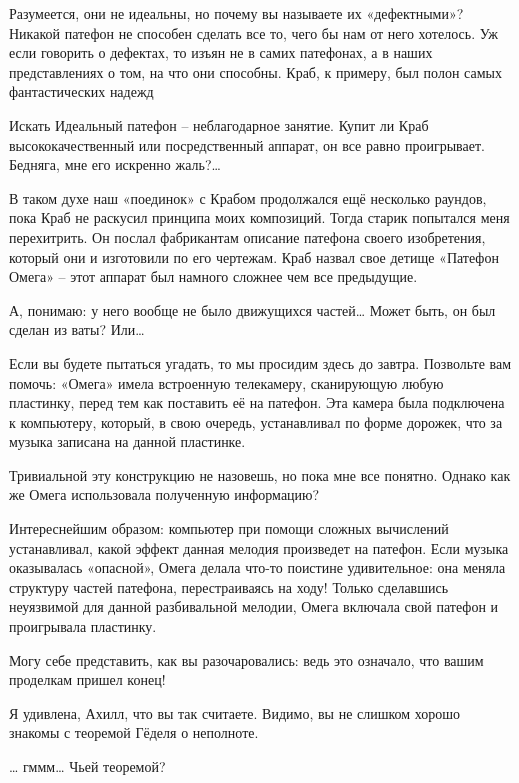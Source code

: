 \documentclass[../main.tex]{subfiles}
\begin{document}
\begin{Dialogue}
 Разумеется, они не идеальны, но почему вы называете их «дефектными»? Никакой патефон не способен сделать все то, чего бы нам от него хотелось. Уж если говорить о дефектах, то изъян не в самих патефонах, а в наших представлениях о том, на что они способны. Краб, к примеру, был полон самых фантастических надежд

 Искать Идеальный патефон \--- неблагодарное занятие. Купит ли Краб высококачественный или посредственный аппарат, он все равно проигрывает. Бедняга, мне его искренно жаль?\ldots{}

 В таком духе наш «поединок» с Крабом продолжался ещё несколько раундов, пока Краб не раскусил принципа моих композиций. Тогда старик попытался меня перехитрить. Он послал фабрикантам описание патефона своего изобретения, который они и изготовили по его чертежам. Краб назвал свое детище «Патефон Омега» \--- этот аппарат был намного сложнее чем все предыдущие.

 А, понимаю: у него вообще не было движущихся частей\ldots{} Может быть, он был сделан из ваты? Или\ldots{}

 Если вы будете пытаться угадать, то мы просидим здесь до завтра. Позвольте вам помочь: «Омега» имела встроенную телекамеру, сканирующую любую пластинку, перед тем как поставить её на патефон. Эта камера была подключена к компьютеру, который, в свою очередь, устанавливал по форме дорожек, что за музыка записана на данной пластинке.

 Тривиальной эту конструкцию не назовешь, но пока мне все понятно. Однако как же Омега использовала полученную информацию?

 {\Large И}нтереснейшим образом: компьютер при помощи сложных вычислений устанавливал, какой эффект данная мелодия произведет на патефон. Если музыка оказывалась «опасной», Омега делала что-то поистине удивительное: она меняла структуру частей патефона, перестраиваясь на ходу! Только сделавшись неуязвимой для данной разбивальной мелодии, Омега включала свой патефон и проигрывала пластинку.

 Могу себе представить, как вы разочаровались: ведь это означало, что вашим проделкам пришел конец!

 Я удивлена, Ахилл, что вы так считаете. Видимо, вы не слишком хорошо знакомы с теоремой Гёделя о неполноте.

 \ldots{} гммм\ldots{} Чьей теоремой?


\end{Dialogue}
\end{document}
